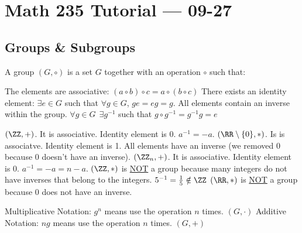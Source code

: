 \documentclass[11pt]{scrartcl}
\begin{document}
\section{Math 235 Tutorial --- 09-27}

\subsection{Groups \& Subgroups}

\begin{definition}
  A group $(G, \circ)$ is a set $G$ together with an operation $\circ$ such that:
  \begin{enumerate}
    \ii The elements are associative:
    $(a \circ b) \circ c = a \circ (b \circ c)$
    \ii There exists an identity element:
    $\exists e \in G$ such that $\forall g \in G$, $ge = eg = g$.
    \ii All elements contain an inverse within the group.
    $\forall g \in G \ \ \exists g^{-1}$ such that $g \circ g^{-1} = g^{-1} g = e$
  \end{enumerate}
\end{definition}

\begin{example}
  \begin{enumerate}
    \ii[]
    \ii
    $(\ZZ, +)$. It is associative. Identity element is 0. $a^{-1} = -a$.
    \ii
    $(\RR \setminus \{0\}, *)$. Is is associatve. Identity element is 1. All elements have an inverse (we removed 0 because 0 doesn't have an inverse).
    \ii
    $(\ZZ_n, +)$. It is associative. Identity element is 0. $a^{-1} = -a = n - a$.
    \ii
    $(\ZZ, *)$ is \ul{NOT} a group because many integers do not have inverses that belong to the integers. $5^{-1} = \frac{1}{5} \notin \ZZ$
    \ii
    $(\RR, *)$ is \ul{NOT} a group because 0 does not have an inverse.
  \end{enumerate}
\end{example}

\begin{note}
  \begin{enumerate}
    \ii[]
    \ii Multiplicative Notation: $g^n$ means use the operation $n$ times. $(G, \cdot)$ 
    \ii
    Additive Notation: $ng$ means use the operation $n$ times. $(G, +)$
  \end{enumerate}
\end{note}
\end{document}
